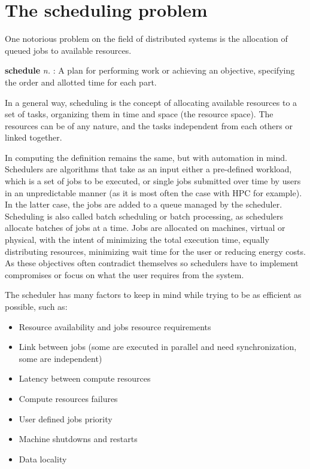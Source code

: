 \section{The scheduling problem}


One notorious problem on the field of distributed systems is the allocation of
queued jobs to available resources.

\begin{displayquote}[][]
	\textbf{schedule} \textit{n.} : A plan for
	performing work or achieving an objective, specifying the order and
	allotted time for each part.
\end{displayquote}

In a general way, scheduling is the concept of allocating available resources
to a set of tasks, organizing them in time and space (the resource space). The
resources can be of any nature, and the tasks independent from each others or
linked together.

In computing the definition remains the same, but with automation in mind.
Schedulers are algorithms that take as an input either a pre-defined workload,
which is a set of jobs  to be executed, or single jobs submitted over time by
users in an unpredictable manner (as it is most often the case with HPC for
example). In the latter case, the jobs are added to a queue managed by the
scheduler. Scheduling is also called batch scheduling or batch processing, as
schedulers allocate batches of jobs at a time. Jobs are allocated on machines,
virtual or physical, with the intent of minimizing the total execution time,
equally distributing resources, minimizing wait time for the user or reducing
energy costs. As these objectives often contradict themselves so schedulers have
to implement compromises or focus on what the user requires from the system.

The scheduler has many factors to keep in mind while trying to be as efficient
as possible, such as:

\begin{itemize}
	\item Resource availability and jobs resource requirements
	\item Link between jobs (some are executed in parallel and need synchronization, some are independent)
	\item Latency between compute resources
	\item Compute resources failures
	\item User defined jobs priority
	\item Machine shutdowns and restarts
	\item Data locality
\end{itemize}

